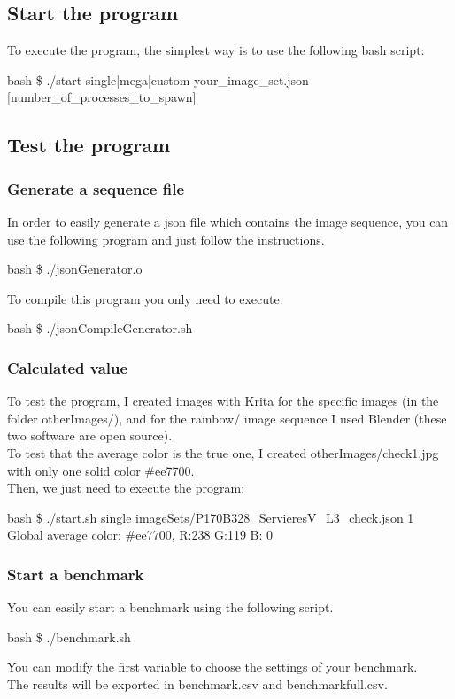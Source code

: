\subsection{Start the program}
To execute the program, the simplest way is to use the following bash script:
\begin{resultbox}
    bash \$ ./start single|mega|custom your\_image\_set.json [number\_of\_processes\_to\_spawn]
\end{resultbox}

\subsection{Test the program}
\subsubsection{Generate a sequence file}
In order to easily generate a json file which contains the image sequence, you can use the following program and just follow the instructions.
\begin{resultbox}
    bash \$ ./jsonGenerator.o
\end{resultbox}
To compile this program you only need to execute:
\begin{resultbox}
    bash \$ ./jsonCompileGenerator.sh
\end{resultbox}
\subsubsection{Calculated value}
To test the program, I created images with Krita for the specific images (in the folder otherImages/), and for the rainbow/ image sequence I used Blender (these two software are open source).\\
To test that the average color is the true one, I created otherImages/check1.jpg with only one solid color \#ee7700.\\
Then, we just need to execute the program:
\begin{resultbox}
bash \$ ./start.sh single imageSets/P170B328\_ServieresV\_L3\_check.json 1\\
Global average color: \#ee7700, R:238 G:119 B:  0
\end{resultbox}

\subsubsection{Start a benchmark}
You can easily start a benchmark using the following script.
\begin{resultbox}
    bash \$ ./benchmark.sh
\end{resultbox}
You can modify the first variable to choose the settings of your benchmark.\\
The results will be exported in benchmark.csv and benchmarkfull.csv.